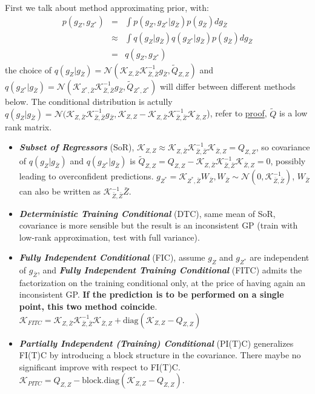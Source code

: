 \documentclass[10pt]{elegantbook}
\newcommand{\mydefination}[1]{\textbf{\textit{\textcolor{structurecolor}{#1}}}}
\begin{document}
First we talk about method approximating prior, with:
\begin{equation}
    \begin{array}{rll}
        p(g_{Z},g_{Z^{*}}) &=& \int p(g_{Z},g_{Z^{*}}|g_{\bar Z})p(g_{\bar Z})d g_{\bar Z} \\ 
        &\approx&\int q(g_{Z}|g_{\bar Z})q(g_{Z^{*}}|g_{\bar Z})p(g_{\bar Z})d g_{\bar Z} \\
        &=& q(g_{Z},g_{Z^{*}})
    \end{array}
\end{equation}
the choice of $q(g_{Z}|g_{\bar Z}) = \mathcal N(\mathscr{K}_{Z, \bar Z}\mathscr{K}_{\bar Z, \bar Z}^{-1}g_{\bar Z}, \tilde Q_{Z, Z})$ 
and $q(g_{Z^{*}}|g_{\bar Z}) = \mathcal N(\mathscr{K}_{Z^*, \bar Z}\mathscr{K}_{\bar Z, \bar Z}^{-1}g_{\bar Z}, \tilde Q_{Z^*, Z^*})$ 
will differ between different methods below. The conditional distribution is actully $q(g_{Z}|g_{\bar Z}) = \mathcal N(\mathscr{K}_{Z,
 \bar Z}\mathscr{K}_{\bar Z, \bar Z}^{-1}g_{\bar Z}, \mathscr{K}_{Z, Z} - \mathscr{K}_{Z, \bar Z}
 \mathscr{K}_{\bar Z, \bar Z}^{-1}\mathscr{K}_{\bar Z, Z}$), 
refer to \href{https://statproofbook.github.io/P/mvn-cond.html}{proof}, $\tilde Q$ is a low rank matrix.
\begin{itemize}
    \item \mydefination{Subset of Regressors} (SoR), $\mathscr{K}_{Z, Z} \approx \mathscr{K}_{Z, \bar Z}\mathscr{K}_{\bar Z, \bar Z}^{-1}\mathscr{K}_{\bar Z, Z} = Q_{Z, Z}$,
so covariance of $q(g_{Z}|g_{\bar Z})$ and $q(g_{Z^{*}}|g_{\bar Z})$ is $\tilde Q_{Z, Z} = Q_{Z, Z} - \mathscr{K}_{Z, \bar Z}\mathscr{K}_{\bar Z, \bar Z}^{-1}\mathscr{K}_{\bar Z, Z}= 0$, 
possibly leading to overconfident predictions. $g_{Z^{*}} = \mathscr{K}_{Z^*, \bar Z} W_{\bar Z}, W_{\bar Z} \sim \mathcal N(0, \mathscr{K}_{\bar Z, \bar Z}^{-1})$, 
$W_{\bar Z}$ can also be written as $\mathscr{K}_{\bar Z, \bar Z}^{-1} \bar Z$.
    \item \mydefination{Deterministic Training Conditional} (DTC), same mean of SoR, covariance is more sensible but the result 
is an inconsistent GP (train with low-rank approximation, test with full variance).
    \item \mydefination{Fully Independent Conditional} (FIC), assume $g_{Z}$ and $g_{Z^{*}}$ are independent of $g_{\bar Z}$,
and \mydefination{Fully Independent Training Conditional} (FITC) admits the factorization on the training conditional only, at the price of having again an inconsistent
GP. \textbf{If the prediction is to be performed on a single point, this two method coincide}. $\mathscr{K}_{FITC} = 
\mathscr{K}_{Z, \bar Z}\mathscr{K}_{\bar Z, \bar Z}^{-1}\mathscr{K}_{\bar Z, Z} + \text{diag} (\mathscr{K}_{Z, Z} - Q_{Z, Z})$
    \item \mydefination{Partially Independent (Training) Conditional} (PI(T)C) generalizes FI(T)C by
introducing a block structure in the covariance. There maybe no significant improve with respect to FI(T)C.
$\mathscr{K}_{PITC} = Q_{Z, Z} - \text{block.diag}(\mathscr{K}_{Z, Z} - Q_{Z, Z})$.
\end{itemize}
\end{document}

